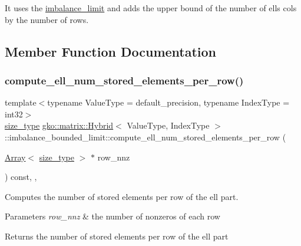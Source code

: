 It uses the \hyperlink{classgko_1_1matrix_1_1Hybrid_1_1imbalance__limit}{imbalance\+\_\+limit} and adds the upper bound of the number of ell\textquotesingle{}s cols by the number of rows. 

\subsection{Member Function Documentation}
\mbox{\label{classgko_1_1matrix_1_1Hybrid_1_1imbalance__bounded__limit_ae68c0d740e1424f5cdb3be5919a856b8}} 
\subsubsection{\texorpdfstring{compute\+\_\+ell\+\_\+num\+\_\+stored\+\_\+elements\+\_\+per\+\_\+row()}{compute\_ell\_num\_stored\_elements\_per\_row()}}
{\footnotesize\ttfamily template$<$typename Value\+Type = default\+\_\+precision, typename Index\+Type = int32$>$ \\
\hyperlink{namespacegko_a6e5c95df0ae4e47aab2f604a22d98ee7}{size\+\_\+type} \hyperlink{classgko_1_1matrix_1_1Hybrid}{gko\+::matrix\+::\+Hybrid}$<$ Value\+Type, Index\+Type $>$\+::imbalance\+\_\+bounded\+\_\+limit\+::compute\+\_\+ell\+\_\+num\+\_\+stored\+\_\+elements\+\_\+per\+\_\+row (\begin{DoxyParamCaption}\item[{\hyperlink{classgko_1_1Array}{Array}$<$ \hyperlink{namespacegko_a6e5c95df0ae4e47aab2f604a22d98ee7}{size\+\_\+type} $>$ $\ast$}]{row\+\_\+nnz }\end{DoxyParamCaption}) const\hspace{0.3cm}{\ttfamily [inline]}, {\ttfamily [override]}, {\ttfamily [virtual]}}



Computes the number of stored elements per row of the ell part. 


\begin{DoxyParams}{Parameters}
{\em row\+\_\+nnz} & the number of nonzeros of each row\\
\hline
\end{DoxyParams}
\begin{DoxyReturn}{Returns}
the number of stored elements per row of the ell part 
\end{DoxyReturn}



